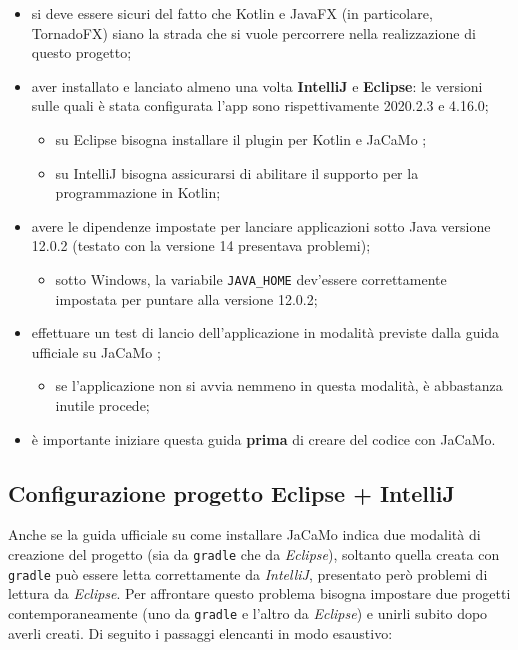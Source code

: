 \documentclass[12pt,a4paper,openright,oneside]{report}
\begin{document}
\begin{itemize}
	\item si deve essere sicuri del fatto che Kotlin e JavaFX (in particolare, TornadoFX) siano la strada che si vuole percorrere nella realizzazione di questo progetto;
	
	\item aver installato e lanciato almeno una volta \textbf{IntelliJ} e \textbf{Eclipse}: le versioni sulle quali è stata configurata l'app sono rispettivamente 2020.2.3 e 4.16.0;
	\begin{itemize}
		\item su Eclipse bisogna installare il plugin per Kotlin e JaCaMo \cite{eclipse};
		
		\item su IntelliJ bisogna assicurarsi di abilitare il supporto per la programmazione in Kotlin;
	\end{itemize}

	\item avere le dipendenze impostate per lanciare applicazioni sotto Java versione 12.0.2 (testato con la versione 14 presentava problemi);
	\begin{itemize}
		\item sotto Windows, la variabile \texttt{JAVA\_HOME} dev'essere correttamente impostata per puntare alla versione 12.0.2;
	\end{itemize}

	\item effettuare un test di lancio dell'applicazione in modalità previste dalla guida ufficiale su JaCaMo \cite{jacamo};
	\begin{itemize}
		\item se l'applicazione non si avvia nemmeno in questa modalità, è abbastanza inutile procede;
	\end{itemize}
	
	\item è importante iniziare questa guida \textbf{prima} di creare del codice con JaCaMo.
\end{itemize}

\subsection{Configurazione progetto Eclipse + IntelliJ}
Anche se la guida ufficiale su come installare JaCaMo indica due modalità di creazione del progetto (sia da \texttt{gradle} che da \textit{Eclipse}), soltanto quella creata con \texttt{gradle} può essere letta correttamente da \textit{IntelliJ}, presentato però problemi di lettura da \textit{Eclipse}. Per affrontare questo problema bisogna impostare due progetti contemporaneamente (uno da \texttt{gradle} e l'altro da \textit{Eclipse}) e unirli subito dopo averli creati. Di seguito i passaggi elencanti in modo esaustivo:
\end{document}
